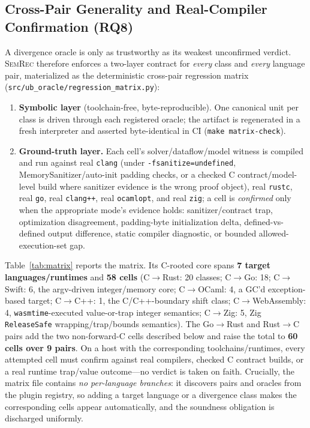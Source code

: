 \documentclass[10pt,a4paper]{article}
\begin{document}
\subsection{Cross-Pair Generality and Real-Compiler Confirmation
(RQ8)}\label{sec:eval-matrix}

A divergence oracle is only as trustworthy as its weakest unconfirmed verdict.
\textsc{SemRec} therefore enforces a two-layer contract for \emph{every} class
and \emph{every} language pair, materialized as the deterministic cross-pair
regression matrix (\texttt{src/ub\_oracle/regression\_matrix.py}):

\begin{enumerate}[nosep]
  \item \textbf{Symbolic layer} (toolchain-free, byte-reproducible). One
    canonical unit per class is driven through each registered oracle; the
    artifact is regenerated in a fresh interpreter and asserted byte-identical
    in CI (\texttt{make matrix-check}).
  \item \textbf{Ground-truth layer.} Each cell's solver/dataflow/model witness is compiled and run
    against real \texttt{clang} (under \texttt{-fsanitize=undefined},
    MemorySanitizer/auto-init padding checks, or a checked C
    contract/model-level build where sanitizer evidence is the wrong
    proof object), real \texttt{rustc}, real \texttt{go}, real \texttt{clang++},
    real \texttt{ocamlopt}, and real \texttt{zig}; a cell is \emph{confirmed} only when the
    appropriate mode's evidence holds: sanitizer/contract trap, optimization
    disagreement, padding-byte initialization delta, defined-vs-defined output
    difference, static compiler diagnostic, or bounded allowed-execution-set gap.
\end{enumerate}

Table~\ref{tab:matrix} reports the matrix. Its C-rooted core spans \textbf{7
target languages/runtimes} and \textbf{58 cells} (C$\to$Rust: 20 classes;
C$\to$Go: 18; C$\to$Swift: 6, the argv-driven integer/memory core; C$\to$OCaml:
4, a GC'd exception-based target; C$\to$C++: 1, the C/C++-boundary shift class;
C$\to$WebAssembly: 4, \texttt{wasmtime}-executed value-or-trap integer
semantics; C$\to$Zig: 5, Zig \texttt{ReleaseSafe} wrapping/trap/bounds
semantics). The Go$\to$Rust and Rust$\to$C pairs add the two non-forward-C cells
described below and raise the total to \textbf{60 cells over 9 pairs}. On a host
with the corresponding toolchains/runtimes, every attempted cell must confirm
against real compilers, checked C contract builds, or a real runtime trap/value
outcome---no verdict is taken on
faith. Crucially, the matrix file contains \emph{no per-language branches}: it
discovers pairs and oracles from the plugin registry, so adding a target
language or a divergence class makes the corresponding cells appear
automatically, and the soundness obligation is discharged uniformly.
\end{document}
